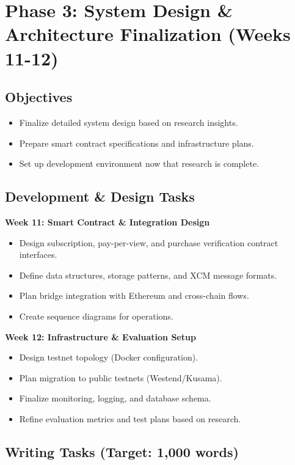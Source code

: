 \documentclass[12pt,a4paper]{article}
\begin{document}
\section{Phase 3: System Design \& Architecture Finalization (Weeks 11-12)}

\subsection*{Objectives}

\begin{itemize}
    \item Finalize detailed system design based on research insights.
    \item Prepare smart contract specifications and infrastructure plans.
    \item Set up development environment now that research is complete.
\end{itemize}

\subsection*{Development \& Design Tasks}

\textbf{Week 11: Smart Contract \& Integration Design}
\begin{itemize}
    \item Design subscription, pay-per-view, and purchase verification contract interfaces.
    \item Define data structures, storage patterns, and XCM message formats.
    \item Plan bridge integration with Ethereum and cross-chain flows.
    \item Create sequence diagrams for operations.
\end{itemize}

\textbf{Week 12: Infrastructure \& Evaluation Setup}
\begin{itemize}
    \item Design testnet topology (Docker configuration).
    \item Plan migration to public testnets (Westend/Kusama).
    \item Finalize monitoring, logging, and database schema.
    \item Refine evaluation metrics and test plans based on research.
\end{itemize}

\subsection*{Writing Tasks (Target: 1,000 words)}
\end{document}
